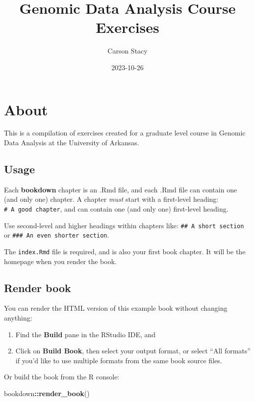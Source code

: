 \documentclass[
]{book}
\title{Genomic Data Analysis Course Exercises}
\author{Carson Stacy}
\date{2023-10-26}
\newenvironment{Shaded}{\begin{snugshade}}{\end{snugshade}}
\newcommand{\FunctionTok}[1]{\textcolor[rgb]{0.13,0.29,0.53}{\textbf{#1}}}
\newcommand{\NormalTok}[1]{#1}
\newcommand{\SpecialCharTok}[1]{\textcolor[rgb]{0.81,0.36,0.00}{\textbf{#1}}}
\begin{document}
\maketitle

{
\setcounter{tocdepth}{1}
\tableofcontents
}
\hypertarget{about}{%
\chapter{About}\label{about}}

This is a compilation of exercises created for a graduate level course in Genomic Data Analysis at the University of Arkansas.

\hypertarget{usage}{%
\section{Usage}\label{usage}}

Each \textbf{bookdown} chapter is an .Rmd file, and each .Rmd file can contain one (and only one) chapter. A chapter \emph{must} start with a first-level heading: \texttt{\#\ A\ good\ chapter}, and can contain one (and only one) first-level heading.

Use second-level and higher headings within chapters like: \texttt{\#\#\ A\ short\ section} or \texttt{\#\#\#\ An\ even\ shorter\ section}.

The \texttt{index.Rmd} file is required, and is also your first book chapter. It will be the homepage when you render the book.

\hypertarget{render-book}{%
\section{Render book}\label{render-book}}

You can render the HTML version of this example book without changing anything:

\begin{enumerate}
\def\labelenumi{\arabic{enumi}.}
\item
  Find the \textbf{Build} pane in the RStudio IDE, and
\item
  Click on \textbf{Build Book}, then select your output format, or select ``All formats'' if you'd like to use multiple formats from the same book source files.
\end{enumerate}

Or build the book from the R console:

\begin{Shaded}
\begin{Highlighting}[]
\NormalTok{bookdown}\SpecialCharTok{::}\FunctionTok{render\_book}\NormalTok{()}
\end{Highlighting}
\end{Shaded}
\end{document}
